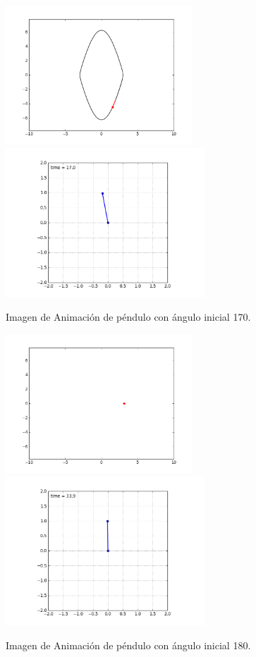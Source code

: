 \documentclass[12pt]{article}
\begin{document}
\begin{figure}[H]
\centering
\includegraphics[width=7cm]{Fase170.png}
\includegraphics[width=7.5cm]{Pendulo170.png}
\caption{Imagen de Animación de péndulo con ángulo inicial 170.}
\end{figure}

\begin{figure}[H]
\centering
\includegraphics[width=7cm]{Fase180.png}
\includegraphics[width=7.5cm]{Pendulo180.png}
\caption{Imagen de Animación de péndulo con ángulo inicial 180.}
\end{figure}
\end{document}
